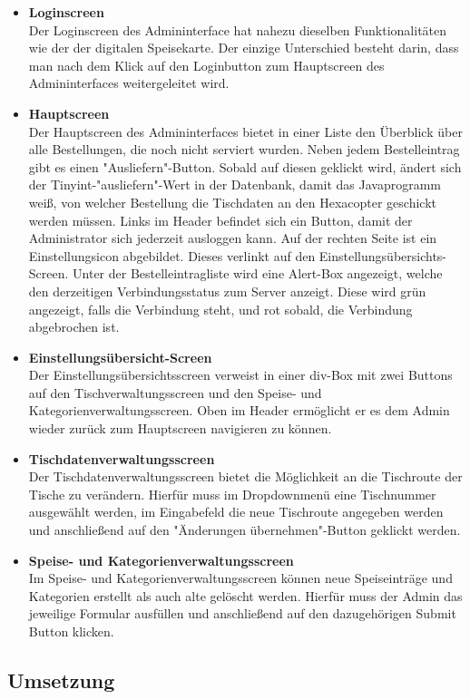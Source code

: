 \begin{itemize}
    \item \textbf{Loginscreen}\\
Der Loginscreen des Admininterface hat nahezu dieselben Funktionalitäten wie der der digitalen Speisekarte. Der einzige Unterschied besteht darin, dass man nach dem Klick auf den Loginbutton zum Hauptscreen des Admininterfaces weitergeleitet wird.
    \item \textbf{Hauptscreen}\\
Der Hauptscreen des Admininterfaces bietet in einer Liste den Überblick über alle Bestellungen, die noch nicht serviert wurden.
Neben jedem Bestelleintrag gibt es einen "Ausliefern"-Button. Sobald auf diesen geklickt wird, ändert sich der Tinyint-"ausliefern"-Wert in der Datenbank, damit das Javaprogramm weiß, von welcher Bestellung die Tischdaten an den Hexacopter geschickt werden müssen.
Links im Header befindet sich ein Button, damit der Administrator sich jederzeit ausloggen kann.
Auf der rechten Seite ist ein Einstellungsicon abgebildet. Dieses verlinkt auf den Einstellungsübersichts-Screen.
Unter der Bestelleintragliste wird eine Alert-Box angezeigt, welche den derzeitigen Verbindungsstatus zum Server anzeigt. Diese wird grün angezeigt, falls die Verbindung steht, und rot sobald, die Verbindung abgebrochen ist.
    \item \textbf{Einstellungsübersicht-Screen}\\
Der Einstellungsübersichtsscreen verweist in einer div-Box mit zwei Buttons auf den Tischverwaltungsscreen und den Speise- und Kategorienverwaltungsscreen.
Oben im Header ermöglicht er es dem Admin wieder zurück zum Hauptscreen navigieren zu können.
    \item \textbf{Tischdatenverwaltungsscreen}\\
Der Tischdatenverwaltungsscreen bietet die Möglichkeit an die Tischroute der Tische zu verändern. Hierfür muss im Dropdownmenü eine Tischnummer ausgewählt werden, im Eingabefeld die neue Tischroute angegeben werden und anschließend auf den "Änderungen übernehmen"-Button geklickt werden.
    \item \textbf{Speise- und Kategorienverwaltungsscreen}\\
Im Speise- und Kategorienverwaltungsscreen können neue Speiseinträge und Kategorien erstellt als auch alte gelöscht werden.
Hierfür muss der Admin das jeweilige Formular ausfüllen und anschließend auf den dazugehörigen Submit Button klicken.
  \end{itemize}
  \subsection{Umsetzung}

